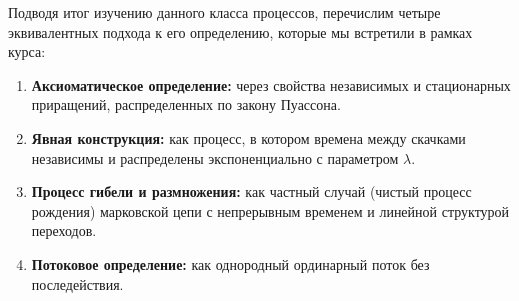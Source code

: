 Подводя итог изучению данного класса процессов, перечислим четыре эквивалентных подхода к его определению, которые мы встретили в рамках курса:

\begin{enumerate}
    \item \textbf{Аксиоматическое определение:} через свойства независимых и стационарных приращений, распределенных по закону Пуассона.
    \item \textbf{Явная конструкция:} как процесс, в котором времена между скачками независимы и распределены экспоненциально с параметром $\lambda$.
    \item \textbf{Процесс гибели и размножения:} как частный случай (чистый процесс рождения) марковской цепи с непрерывным временем и линейной структурой переходов.
    \item \textbf{Потоковое определение:} как однородный ординарный поток без последействия.
\end{enumerate}